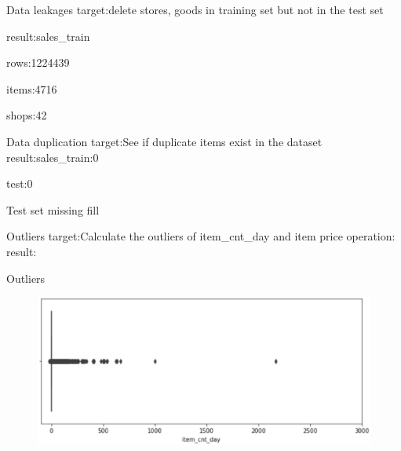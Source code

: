 \documentclass[
 size=14pt,
 paper=smartboard,  %
 mode=present, 		%
 display=slides, 	%
 style=tuliplab,  	%
 pauseslide,
 fleqn,leqno]{powerdot}
\begin{document}
\begin{slide}[toc=,bm=]{Data leakages}
  target:delete stores, goods in training set but not in the test set\par
  result:sales_train\par
    rows:1224439\par
    items:4716\par
    shops:42\par
\end{slide}


\begin{slide}[toc=,bm=]{Data duplication}
  target:See if duplicate items exist in the dataset
  result:sales_train:0\par
          test:0\par
\end{slide}


\begin{slide}[toc=,bm=]{Test set missing fill}

\end{slide}

\begin{slide}[toc=,bm=]{Outliers}
  target:Calculate the outliers of item_cnt_day and item price
  operation:
  result:
\end{slide}

\begin{slide}[toc=,bm=]{Outliers}
  \begin{figure}
    \includegraphics[scale=0.5]{picture/data_7.eps}
  \end{figure}
\end{slide}
\end{document}
